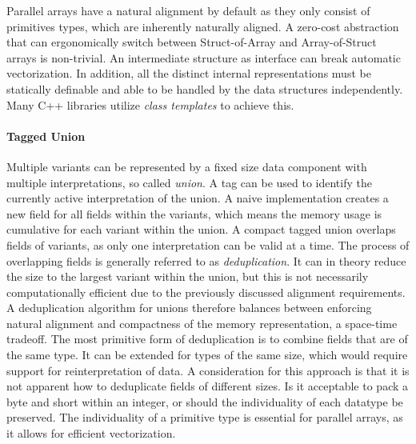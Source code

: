 \documentclass{article}
\begin{document}
Parallel arrays have a natural alignment by default as they only consist of primitives types, which are inherently naturally aligned.
A zero-cost abstraction that can ergonomically switch between Struct-of-Array and Array-of-Struct arrays is non-trivial.
An intermediate structure as interface can break automatic vectorization\cite{abstraction-vectorization}. 
In addition, all the distinct internal representations must be statically definable and able to be handled by the data structures independently.
Many C++ libraries utilize {\it class templates} to achieve this\cite{abstraction-vectorization}.

\paragraph{Tagged Union}

Multiple variants can be represented by a fixed size data component with multiple interpretations, so called {\it union}.
A tag can be used to identify the currently active interpretation of the union. 
A naive implementation creates a new field for all fields within the variants, which means the memory usage is cumulative for each variant within the union. 
A compact tagged union overlaps fields of variants, as only one interpretation can be valid at a time.
The process of overlapping fields is generally referred to as {\it deduplication}.
It can in theory reduce the size to the largest variant within the union, but this is not necessarily computationally efficient due to the previously discussed alignment requirements\cite{accelerate-sum-types}.
A deduplication algorithm for unions therefore balances between enforcing natural alignment and compactness of the memory representation, a space-time tradeoff.
The most primitive form of deduplication is to combine fields that are of the same type.
It can be extended for types of the same size, which would require support for reinterpretation of data.
A consideration for this approach is that it is not apparent how to deduplicate fields of different sizes.
Is it acceptable to pack a byte and short within an integer, or should the individuality of each datatype be preserved.
The individuality of a primitive type is essential for parallel arrays, as it allows for efficient vectorization.
\end{document}

